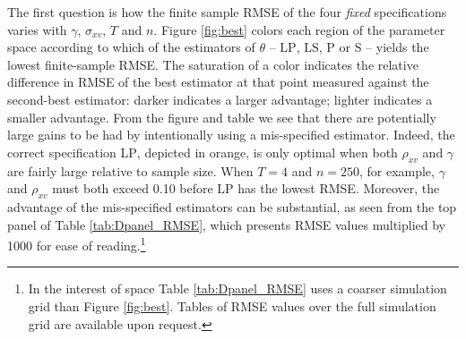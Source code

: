 The first question is how the finite sample RMSE of the four \emph{fixed} specifications varies with $\gamma$, $\sigma_{xv}$, $T$ and $n$.
Figure \ref{fig:best} colors each region of the parameter space according to which of the estimators of $\theta$ -- $\text{LP}$, $\text{LS}$, $\text{P}$ or $\text{S}$ -- yields the lowest finite-sample RMSE.
The saturation of a color indicates the relative difference in RMSE of the best estimator at that point measured against the second-best estimator: darker indicates a larger advantage; lighter indicates a smaller advantage. 
From the figure and table we see that there are potentially large gains to be had by intentionally using a mis-specified estimator.
Indeed, the correct specification $\text{LP}$, depicted in orange, is only optimal when both $\rho_{xv}$ and $\gamma$ are fairly large relative to sample size.
When $T=4$ and $n=250$, for example, $\gamma$ and $\rho_{xv}$ must both exceed 0.10 before $\text{LP}$ has the lowest RMSE.
Moreover, the advantage of the mis-specified estimators can be substantial, as seen from the top panel of Table \ref{tab:Dpanel_RMSE}, which presents RMSE values multiplied by 1000 for ease of reading.\footnote{In the interest of space Table \ref{tab:Dpanel_RMSE} uses a coarser simulation grid than Figure \ref{fig:best}. Tables of RMSE values over the full simulation grid are available upon request.}

